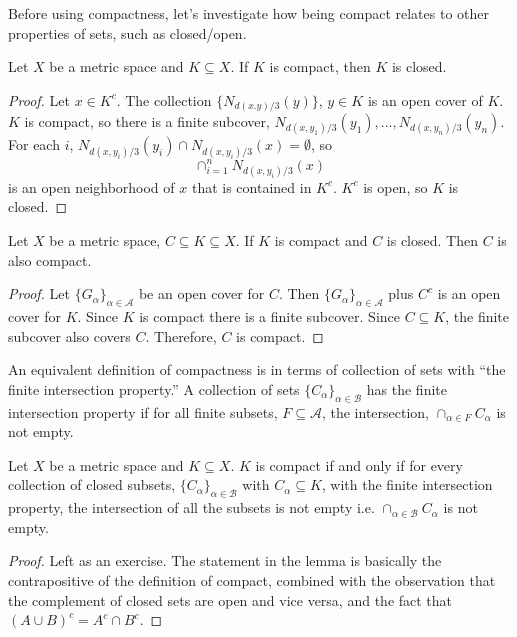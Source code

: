 Before using compactness, let's investigate how being compact relates
to other properties of sets, such as closed/open. 
\begin{lemma}\label{lem:compactClosed}
  Let $X$ be a metric space and $K \subseteq X$. If $K$ is compact,
  then $K$ is closed.
\end{lemma}
\begin{proof}
  Let $x \in K^c$. The collection $\{N_{d(x.y)/3}(y)\}$, $y\in K$ is an
  open cover of $K$. $K$ is compact, so there is a finite subcover,
  $N_{d(x,y_1)/3}(y_1), ... , N_{d(x,y_n)/3}(y_n)$.  For each $i$,
  $N_{d(x,y_i)/3}(y_i) \cap N_{d(x,y_i)/3}(x) = \emptyset$, so 
  \[ \cap_{i=1}^n N_{d(x,y_i)/3}(x) \]
  is an open neighborhood of $x$ that is contained in $K^c$. $K^c$ is
  open, so $K$ is closed.
\end{proof}
\begin{lemma}
  Let $X$ be a metric space, $C \subseteq K \subseteq X$. If $K$ is
  compact and $C$ is closed. Then $C$ is also compact.
\end{lemma}
\begin{proof}
  Let $\{G_\alpha\}_{\alpha \in \mathcal{A}}$ be an open cover for
  $C$. Then $\{G_\alpha\}_{\alpha \in \mathcal{A}}$ plus $C^c$ is an
  open cover for $K$. Since $K$ is compact there is a finite
  subcover. Since $C \subseteq K$, the finite subcover also covers
  $C$. Therefore, $C$ is compact. 
\end{proof}
An equivalent definition of compactness is in terms of collection of
sets with ``the finite intersection property.'' A collection of sets
$\{C_\alpha \}_{\alpha \in \mathcal{B}}$ has the finite intersection
property if for all finite subsets, $F \subseteq \mathcal{A}$, the
intersection, $\cap_{\alpha \in F} C_\alpha$ is not empty.
\begin{lemma}
  Let $X$ be a metric space and $K \subseteq X$. $K$ is compact if and
  only if for every collection of closed subsets, $\{C_\alpha\}_{\alpha
  \in \mathcal{B}}$ with $C_\alpha \subseteq K$, with the finite
  intersection property, the intersection of all the subsets is not
  empty i.e. 
  $\cap_{\alpha \in \mathcal{B}} C_\alpha$ is not empty.
\end{lemma}
\begin{proof}
  Left as an exercise. The statement in the lemma is basically the
  contrapositive of the definition of compact, combined with the
  observation that the complement of closed sets are open and vice
  versa, and the fact that $(A \cup B)^c = A^c \cap B^c$.
\end{proof}

